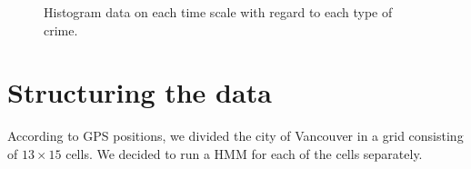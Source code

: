 \documentclass{article}
\begin{document}
\begin{figure}[h!]
\centering    
{}
\caption{Histogram data on each time scale with regard to each type of crime.}
\label{fig:exploratory_data}
\end{figure}

\section{Structuring the data}
According to GPS positions, we divided the city of Vancouver in a grid consisting of $13 \times 15$ cells. We decided to run a HMM for each of the cells separately.
\end{document}
